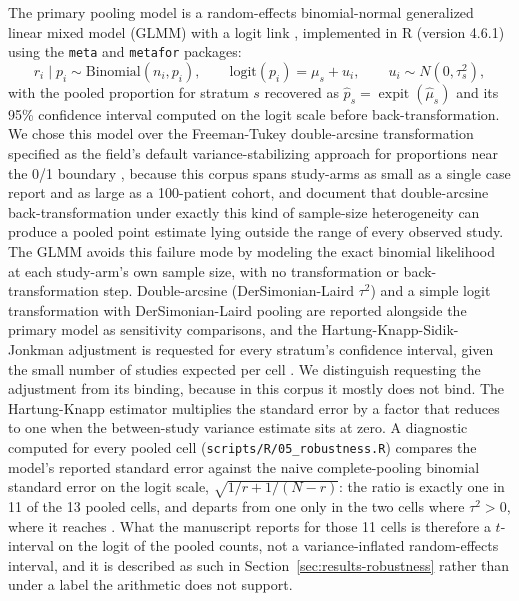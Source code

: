 The primary pooling model is a random-effects binomial-normal generalized linear mixed model (GLMM) with a logit link \parencite{Hamza2008_binomial,Nyaga2014_metaprop}, implemented in R (version 4.6.1) using the \texttt{meta} and \texttt{metafor} packages:
\[
r_i \mid p_i \sim \text{Binomial}(n_i, p_i), \qquad \text{logit}(p_i) = \mu_s + u_i, \qquad u_i \sim N(0, \tau_s^2),
\]
with the pooled proportion for stratum $s$ recovered as $\hat p_s = \operatorname{expit}(\hat\mu_s)$ and its 95\% confidence interval computed on the logit scale before back-transformation. We chose this model over the Freeman-Tukey double-arcsine transformation specified as the field's default variance-stabilizing approach for proportions near the 0/1 boundary \parencite{FreemanTukey1950,Miller1978_inversearcsine}, because this corpus spans study-arms as small as a single case report and as large as a 100-patient cohort, and \textcite{Schwarzer2019_doublearcsine} document that double-arcsine back-transformation under exactly this kind of sample-size heterogeneity can produce a pooled point estimate lying outside the range of every observed study. The GLMM avoids this failure mode by modeling the exact binomial likelihood at each study-arm's own sample size, with no transformation or back-transformation step. Double-arcsine (DerSimonian-Laird $\tau^2$) and a simple logit transformation with DerSimonian-Laird pooling \parencite{DerSimonianLaird1986} are reported alongside the primary model as sensitivity comparisons, and the Hartung-Knapp-Sidik-Jonkman adjustment \parencite{IntHout2014_hksj} is requested for every stratum's confidence interval, given the small number of studies expected per cell \parencite{Barker2021_proportionalma}. We distinguish requesting the adjustment from its binding, because in this corpus it mostly does not bind. The Hartung-Knapp estimator multiplies the standard error by a factor that reduces to one when the between-study variance estimate sits at zero. A diagnostic computed for every pooled cell (\texttt{scripts/R/05\_robustness.R}) compares the model's reported standard error against the naive complete-pooling binomial standard error on the logit scale, $\sqrt{1/r + 1/(N-r)}$: the ratio is exactly one in 11 of the 13 pooled cells, and departs from one only in the two cells where $\tau^2 > 0$, where it reaches \HkMaxRatio. What the manuscript reports for those 11 cells is therefore a $t$-interval on the logit of the pooled counts, not a variance-inflated random-effects interval, and it is described as such in Section~\ref{sec:results-robustness} rather than under a label the arithmetic does not support.

